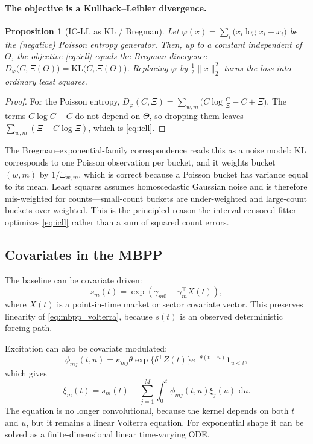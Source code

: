 \documentclass[11pt]{article}
\theoremstyle{plain}
\newtheorem{proposition}{Proposition}[section]
\theoremstyle{definition}
\theoremstyle{remark}
\newcommand{\dd}{\,\mathrm{d}}
\newcommand{\one}{\mathbf{1}}
\begin{document}
\paragraph{The objective is a Kullback--Leibler divergence.}
\begin{proposition}[IC-LL as KL / Bregman]
\label{prop:kl}
Let $\varphi(x)=\sum_i\big(x_i\log x_i-x_i\big)$ be the (negative) Poisson entropy generator. Then, up to a constant independent of $\Theta$, the objective \eqref{eq:icll} equals the Bregman divergence $D_\varphi\!\big(C,\Xi(\Theta)\big)=\mathrm{KL}\big(C,\Xi(\Theta)\big)$. Replacing $\varphi$ by $\tfrac12\|x\|_2^2$ turns the loss into ordinary least squares.
\end{proposition}
\begin{proof}
For the Poisson entropy, $D_\varphi(C,\Xi)=\sum_{w,m}\big(C\log\tfrac{C}{\Xi}-C+\Xi\big)$. The terms $C\log C-C$ do not depend on $\Theta$, so dropping them leaves $\sum_{w,m}(\Xi-C\log\Xi)$, which is \eqref{eq:icll}.
\end{proof}
The Bregman--exponential-family correspondence reads this as a noise model: KL corresponds to one Poisson observation per bucket, and it weights bucket $(w,m)$ by $1/\Xi_{w,m}$, which is correct because a Poisson bucket has variance equal to its mean. Least squares assumes homoscedastic Gaussian noise and is therefore mis-weighted for counts---small-count buckets are under-weighted and large-count buckets over-weighted. This is the principled reason the interval-censored fitter optimizes \eqref{eq:icll} rather than a sum of squared count errors.

\subsection{Covariates in the MBPP}
The baseline can be covariate driven:
\begin{equation}
s_m(t)=\exp\left(\gamma_{m0}+\gamma_m^\top X(t)\right),
\label{eq:baseline_covariates}
\end{equation}
where $X(t)$ is a point-in-time market or sector covariate vector. This preserves linearity of \eqref{eq:mbpp_volterra}, because $s(t)$ is an observed deterministic forcing path.

Excitation can also be covariate modulated:
\begin{equation}
\phi_{mj}(t,u)=\kappa_{mj}\theta \exp\{\delta^\top Z(t)\}e^{-\theta(t-u)}\one_{u<t},
\label{eq:excitation_covariates}
\end{equation}
which gives
\begin{equation}
\xi_m(t)=s_m(t)+\sum_{j=1}^{M}\int_0^t \phi_{mj}(t,u)\xi_j(u)\,\dd u.
\end{equation}
The equation is no longer convolutional, because the kernel depends on both $t$ and $u$, but it remains a linear Volterra equation. For exponential shape it can be solved as a finite-dimensional linear time-varying ODE.
\end{document}

